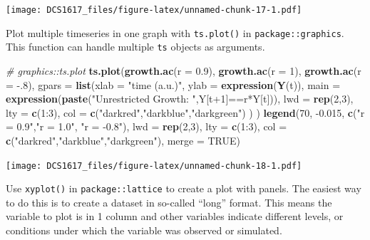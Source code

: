 \documentclass[]{book}
\newenvironment{Shaded}{\begin{snugshade}}{\end{snugshade}}
\newcommand{\KeywordTok}[1]{\textcolor[rgb]{0.13,0.29,0.53}{\textbf{{#1}}}}
\newcommand{\DataTypeTok}[1]{\textcolor[rgb]{0.13,0.29,0.53}{{#1}}}
\newcommand{\DecValTok}[1]{\textcolor[rgb]{0.00,0.00,0.81}{{#1}}}
\newcommand{\FloatTok}[1]{\textcolor[rgb]{0.00,0.00,0.81}{{#1}}}
\newcommand{\StringTok}[1]{\textcolor[rgb]{0.31,0.60,0.02}{{#1}}}
\newcommand{\CommentTok}[1]{\textcolor[rgb]{0.56,0.35,0.01}{\textit{{#1}}}}
\newcommand{\OtherTok}[1]{\textcolor[rgb]{0.56,0.35,0.01}{{#1}}}
\newcommand{\NormalTok}[1]{{#1}}
\begin{document}
\texttt{[image: DCS1617\_files/figure-latex/unnamed-chunk-17-1.pdf]}

Plot multiple timeseries in one graph with \texttt{ts.plot()} in
\texttt{package::graphics}. This function can handle multiple
\texttt{ts} objects as arguments.

\begin{Shaded}
\begin{Highlighting}[]
\CommentTok{# graphics::ts.plot}
\KeywordTok{ts.plot}\NormalTok{(}\KeywordTok{growth.ac}\NormalTok{(}\DataTypeTok{r =} \FloatTok{0.9}\NormalTok{), }
        \KeywordTok{growth.ac}\NormalTok{(}\DataTypeTok{r =} \DecValTok{1}\NormalTok{), }
        \KeywordTok{growth.ac}\NormalTok{(}\DataTypeTok{r =} \NormalTok{-.}\DecValTok{8}\NormalTok{), }
        \DataTypeTok{gpars =} \KeywordTok{list}\NormalTok{(}\DataTypeTok{xlab =} \StringTok{"time (a.u.)"}\NormalTok{,}
                     \DataTypeTok{ylab =} \KeywordTok{expression}\NormalTok{(}\KeywordTok{Y}\NormalTok{(t)),}
                     \DataTypeTok{main =} \KeywordTok{expression}\NormalTok{(}\KeywordTok{paste}\NormalTok{(}\StringTok{"Unrestricted Growth: "}\NormalTok{,Y[t}\DecValTok{+1}\NormalTok{]==r*Y[t])),}
                     \DataTypeTok{lwd =} \KeywordTok{rep}\NormalTok{(}\DecValTok{2}\NormalTok{,}\DecValTok{3}\NormalTok{),}
                     \DataTypeTok{lty =} \KeywordTok{c}\NormalTok{(}\DecValTok{1}\NormalTok{:}\DecValTok{3}\NormalTok{),}
                     \DataTypeTok{col =} \KeywordTok{c}\NormalTok{(}\StringTok{"darkred"}\NormalTok{,}\StringTok{"darkblue"}\NormalTok{,}\StringTok{"darkgreen"}\NormalTok{)}
                     \NormalTok{)}
        \NormalTok{)}
\KeywordTok{legend}\NormalTok{(}\DecValTok{70}\NormalTok{, -}\FloatTok{0.015}\NormalTok{, }\KeywordTok{c}\NormalTok{(}\StringTok{"r = 0.9"}\NormalTok{,}\StringTok{"r = 1.0"}\NormalTok{, }\StringTok{"r = -0.8"}\NormalTok{), }\DataTypeTok{lwd =} \KeywordTok{rep}\NormalTok{(}\DecValTok{2}\NormalTok{,}\DecValTok{3}\NormalTok{), }\DataTypeTok{lty =} \KeywordTok{c}\NormalTok{(}\DecValTok{1}\NormalTok{:}\DecValTok{3}\NormalTok{), }\DataTypeTok{col =} \KeywordTok{c}\NormalTok{(}\StringTok{"darkred"}\NormalTok{,}\StringTok{"darkblue"}\NormalTok{,}\StringTok{"darkgreen"}\NormalTok{), }\DataTypeTok{merge =} \OtherTok{TRUE}\NormalTok{)}
\end{Highlighting}
\end{Shaded}

\texttt{[image: DCS1617\_files/figure-latex/unnamed-chunk-18-1.pdf]}

Use \texttt{xyplot()} in \texttt{package::lattice} to create a plot with
panels. The easiest way to do this is to create a dataset in so-called
``long'' format. This means the variable to plot is in 1 column and
other variables indicate different levels, or conditions under which the
variable was observed or simulated.
\end{document}
